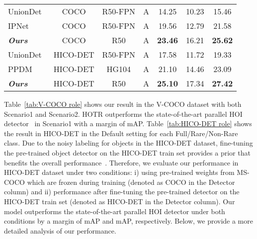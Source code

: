 \documentclass[final]{cvpr}
\begin{document}
\begin{table*}[h!]
\begin{tabular}{l c c c c c c}
    \rowcolor[gray]{0.85}\multicolumn{7}{l}{\textit{\textbf{Parallel HOI Detectors}}} \\ \hline
    \multicolumn{1}{l|}{UnionDet~\cite{bkim2020uniondet}} & COCO & R50-FPN & \multicolumn{1}{c|}{A} & 14.25 & 10.23 & 15.46 \\
    \multicolumn{1}{l|}{IPNet~\cite{wang2020learning}} & COCO & R50-FPN & \multicolumn{1}{c|}{A} & 19.56 & 12.79 & 21.58 \\
    \multicolumn{1}{l|}{\textbf{\textit{Ours}}} & COCO & R50 & \multicolumn{1}{c|}{A} & \textbf{23.46} & 16.21 & \textbf{25.62} \\ \hline
    
    \multicolumn{1}{l|}{UnionDet~\cite{bkim2020uniondet}} & HICO-DET & R50-FPN & \multicolumn{1}{c|}{A} & 17.58 & 11.72 & 19.33 \\
    \multicolumn{1}{l|}{PPDM~\cite{liao2020ppdm}} & HICO-DET & HG104 & \multicolumn{1}{c|}{A} & 21.10 & 14.46 & 23.09 \\
    \multicolumn{1}{l|}{\textbf{\textit{Ours}}} & HICO-DET & R50 & \multicolumn{1}{c|}{A} & \textbf{25.10} & 17.34 & \textbf{27.42} \\
    \bottomrule
  \end{tabular}
  \vspace{3pt}
  \caption{Performance comparison in HICO-DET. The Detector column is denoted as `COCO' for the models that freeze the object detectors with the weights pre-trained in MS-COCO and `HICO-DET' if the object detector is fine-tuned with the HICO-DET train set. The each letter in Feature column stands for A: Appearance (Visual features), S: Interaction Patterns (Spatial Correlations~\cite{gao2018ican}), P: Pose Estimation, L: Linguistic Priors, V: Volume~\cite{li2020detailed}.}
  \label{tab:HICO-DET role}
\end{table*} Table~\ref{tab:V-COCO role} shows our result in the V-COCO dataset with both Scenario1 and Scenario2.
HOTR outperforms the state-of-the-art parallel HOI detector~\cite{wang2020learning} in Scenario1 with a margin of mAP.
Table~\ref{tab:HICO-DET role} shows the result in HICO-DET in the Default setting for each Full/Rare/Non-Rare class.
Due to the noisy labeling for objects in the HICO-DET dataset, fine-tuning the pre-trained object detector on the HICO-DET train set provides a prior that benefits the overall performance~\cite{bansal2020detecting}.
Therefore, we evaluate our performance in HICO-DET dataset under two conditions: i) using pre-trained weights from MS-COCO which are frozen during training (denoted as COCO in the Detector column) and ii) performance after fine-tuning the pre-trained detector on the HICO-DET train set (denoted as HICO-DET in the Detector column).
Our model outperforms the state-of-the-art parallel HOI detector under both conditions by a margin of mAP and mAP, respectively.
Below, we provide a more detailed analysis of our performance.
\newline
\end{document}
